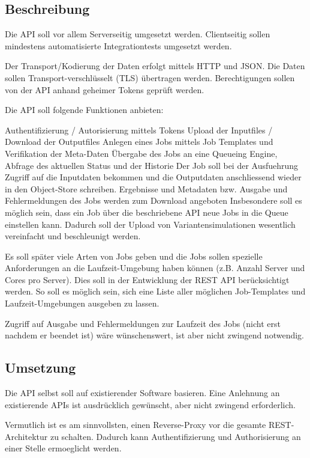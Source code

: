 \documentclass[12pt]{article}
\begin{document}
\subsection{Beschreibung}


Die API soll vor allem Serverseitig umgesetzt werden. Clientseitig sollen mindestens automatisierte Integrationtests umgesetzt werden.

Der Transport/Kodierung der Daten erfolgt mittels HTTP und JSON. Die Daten sollen Transport-verschlüsselt (TLS) übertragen werden. Berechtigungen sollen von der API anhand geheimer Tokens geprüft werden.

Die API soll folgende Funktionen anbieten:

Authentifizierung / Autorisierung mittels Tokens
Upload der Inputfiles / Download der Outputfiles
Anlegen eines Jobs mittels Job Templates und Verifikation der Meta-Daten
Übergabe des Jobs an eine Queueing Engine, Abfrage des aktuellen Status und der Historie
Der Job soll bei der Ausfuehrung Zugriff auf die Inputdaten bekommen und die Outputdaten anschliessend wieder in den Object-Store schreiben.
Ergebnisse und Metadaten bzw. Ausgabe und Fehlermeldungen des Jobs werden zum Download angeboten
Insbesondere soll es möglich sein, dass ein Job über die beschriebene API neue Jobs in die Queue einstellen kann. Dadurch soll der Upload von Variantensimulationen wesentlich vereinfacht und beschleunigt werden.

Es soll später viele Arten von Jobs geben und die Jobs sollen spezielle Anforderungen an die Laufzeit-Umgebung haben können (z.B. Anzahl Server und Cores pro Server). Dies soll in der Entwicklung der REST API berücksichtigt werden. So soll es möglich sein, sich eine Liste aller möglichen Job-Templates und Laufzeit-Umgebungen ausgeben zu lassen.

Zugriff auf Ausgabe und Fehlermeldungen zur Laufzeit des Jobs (nicht erst nachdem er beendet ist) wäre wünschenswert, ist aber nicht zwingend notwendig.

\subsection{Umsetzung}


Die API selbst soll auf existierender Software basieren. Eine Anlehnung an existierende APIs ist ausdrücklich gewünscht, aber nicht zwingend erforderlich.

Vermutlich ist es am sinnvollsten, einen Reverse-Proxy vor die gesamte REST-Architektur zu schalten. Dadurch kann Authentifizierung und Authorisierung an einer Stelle ermoeglicht werden.
\end{document}
